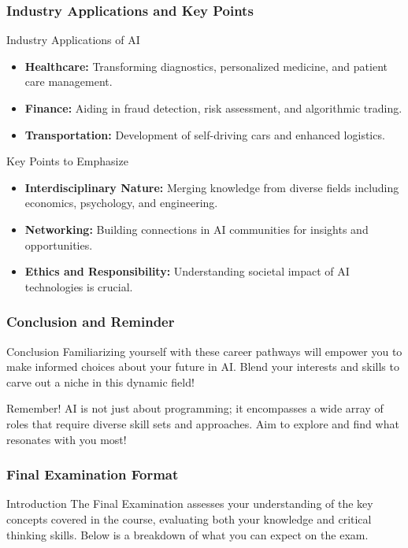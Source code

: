 \documentclass[aspectratio=169]{beamer}
\begin{document}
\begin{frame}[fragile]
    \frametitle{Industry Applications and Key Points}
    \begin{block}{Industry Applications of AI}
    \begin{itemize}
        \item \textbf{Healthcare:} Transforming diagnostics, personalized medicine, and patient care management.
        \item \textbf{Finance:} Aiding in fraud detection, risk assessment, and algorithmic trading.
        \item \textbf{Transportation:} Development of self-driving cars and enhanced logistics.
    \end{itemize}
    \end{block}

    \begin{block}{Key Points to Emphasize}
    \begin{itemize}
        \item \textbf{Interdisciplinary Nature:} Merging knowledge from diverse fields including economics, psychology, and engineering.
        \item \textbf{Networking:} Building connections in AI communities for insights and opportunities.
        \item \textbf{Ethics and Responsibility:} Understanding societal impact of AI technologies is crucial.
    \end{itemize}
    \end{block}
\end{frame}

\begin{frame}[fragile]
    \frametitle{Conclusion and Reminder}
    \begin{block}{Conclusion}
    Familiarizing yourself with these career pathways will empower you to make informed choices about your future in AI. Blend your interests and skills to carve out a niche in this dynamic field!
    \end{block}

    \begin{block}{Remember!}
    AI is not just about programming; it encompasses a wide array of roles that require diverse skill sets and approaches. Aim to explore and find what resonates with you most!
    \end{block}
\end{frame}

\begin{frame}[fragile]
    \frametitle{Final Examination Format}
    \begin{block}{Introduction}
        The Final Examination assesses your understanding of the key concepts covered in the course, evaluating both your knowledge and critical thinking skills. Below is a breakdown of what you can expect on the exam.
    \end{block}
\end{frame}
\end{document}
